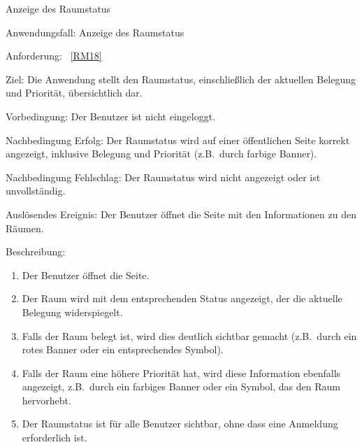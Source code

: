 \begin{function}{70}{Anzeige des Raumstatus}
    \item[Anwendungsfall:] Anzeige des Raumstatus
    \item[Anforderung:] ~\ref{RM18}
    \item[Ziel:] Die Anwendung stellt den Raumstatus, einschließlich der aktuellen Belegung und Priorität, übersichtlich dar.
    \item[Vorbedingung:] Der Benutzer ist nicht eingeloggt. 
    \item[Nachbedingung Erfolg:] Der Raumstatus wird auf einer öffentlichen Seite korrekt angezeigt, inklusive Belegung und Priorität (z.B.\ durch farbige Banner).
    \item[Nachbedingung Fehlschlag:] Der Raumstatus wird nicht angezeigt oder ist unvollständig.
    \item[Auslösendes Ereignis:] Der Benutzer öffnet die Seite mit den Informationen zu den Räumen.
    \item[Beschreibung:] ~
    \begin{enumerate}
        \item Der Benutzer öffnet die Seite.
        \item Der Raum wird mit dem entsprechenden Status angezeigt, der die aktuelle Belegung widerspiegelt.
        \item Falls der Raum belegt ist, wird dies deutlich sichtbar gemacht (z.B.\ durch ein rotes Banner oder ein entsprechendes Symbol).
        \item Falls der Raum eine höhere Priorität hat, wird diese Information ebenfalls angezeigt, z.B.\ durch ein farbiges Banner oder ein Symbol, das den Raum hervorhebt.
        \item Der Raumstatus ist für alle Benutzer sichtbar, ohne dass eine Anmeldung erforderlich ist.
    \end{enumerate}
\end{function}

\pagebreak

